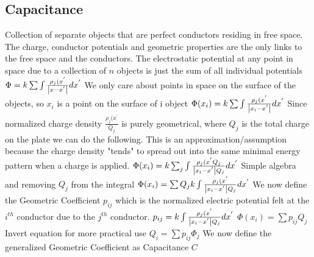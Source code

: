 \documentclass[12pt]{article}
\begin{document}
\subsection{Capacitance}
Collection of separate objects that are perfect conductors residing in free space. The charge, conductor potentials and geometric properties are the only links to the free space and the conductors. 
\newline The electrostatic potential at any point in space due to a collection of $n$ objects is just the sum of all individual potentials
\newline $\Phi = k \sum \int \frac{\rho_j(x^{'}}{\abs{x-x^{'}}} dx^{'}$
\newline We only care about points in space on the surface of the objects, so $x_i$ is a point on the surface of i object
\newline $\Phi(x_i) = k \sum \int \frac{\rho_j(x^{'}}{\abs{x_i-x^{'}}} dx^{'}$
\newline Since normalized charge density $\frac{\rho_j(x^{'}}{Q_j}$ is purely geometrical, where $Q_j$ is the total charge on the plate we can do the following. This is an approximation/assumption because the charge density "tends" to spread out into the same minimal energy pattern when a charge is applied. 
\newline $\Phi(x_i) = k \sum_j \int \frac{\rho_j(x^{'} Q_j}{\abs{x_i-x^{'}}Q_j} dx^{'}$
\newline Simple algebra and removing $Q_j$ from the integral
\newline $\Phi(x_i) = \sum Q_j k \int \frac{\rho_j(x^{'}}{\abs{x_i-x^{'}}Q_j} dx^{'}$
\newline We now define the Geometric Coefficient $p_{ij}$ which is the normalized electric potential felt at the $i^{th}$ conductor due to the $j^{th}$ conductor. 
\newline $p_{ij} = k \int \frac{\rho_j(x^{'}}{\abs{x_i-x^{'}}Q_j} dx^{'}$
\newline $\Phi(x_i) = \sum p_{ij} Q_j$
\newline Invert equation for more practical use
\newline $Q_i = \sum p_{ij} \Phi_j$
\newline We now define the generalized Geometric Coefficient as Capacitance $C$
\end{document}

